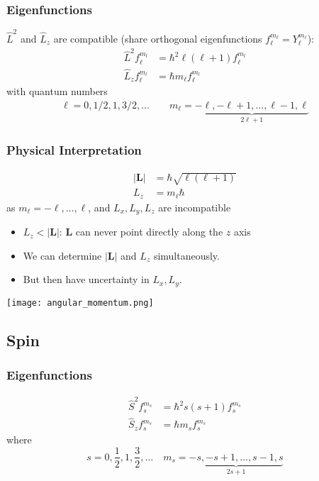 \subsubsection{Eigenfunctions}

$\widehat{L}^2$ and $\widehat{L}_z$ are compatible (share orthogonal eigenfunctions $f_{\ell}^{m_\ell}=Y_{\ell}^{m_\ell}$):
\begin{align*}
    \widehat{L}^2 f_{\ell}^{m_l} & =\hbar^{2}\ell (\ell+1) f_{\ell}^{m_l} \\
    \widehat{L}_z f_{\ell}^{m_l} & =\hbar m_\ell f_{\ell}^{m_l}
\end{align*}
with quantum numbers
\begin{align*}
    \ell  =0, 1/2, 1, 3/2,\ldots\qquad  m_\ell = \underbrace{-\ell, -\ell+1, \ldots, \ell-1, \ell}_{2\ell+1}
\end{align*}

\subsubsection{Physical Interpretation}
\noindent\begin{align*}
    |\mathbf{L}| & =\hbar\sqrt{\ell(\ell+1)} \\
    L_{z}        & =m_{\ell}\hbar
\end{align*}
as $m_{\ell}=-\ell,\dots,\ell$, and $L_x, L_y, L_z$ are incompatible
\begin{itemize}
    \item $L_z < |\mathbf{L}|$: $\mathbf{L}$ can never point directly along the $z$ axis
    \item We can determine $|\mathbf{L}|$ and $L_{z}$ simultaneously.
    \item But then have uncertainty in $L_x, L_y$.
\end{itemize}
\begin{center}
    \texttt{[image: angular\_momentum.png]}
\end{center}

\subsection{Spin}
\subsubsection{Eigenfunctions}

\noindent\begin{align*}
    \widehat{S}^2f_{s}^{m_s}   & =\hbar^{2}s (s+1) f_{s}^{m_s} \\
    \widehat{S}_{z}f_{s}^{m_s} & =\hbar m_s f_{s}^{m_s}
\end{align*}
where
\begin{equation*}
    s =0,\frac{1}{2},1,\frac{3}{2},\dots \quad m_s =\underbrace{-s, -s+1,\dots, s-1, s}_{2s+1}
\end{equation*}

